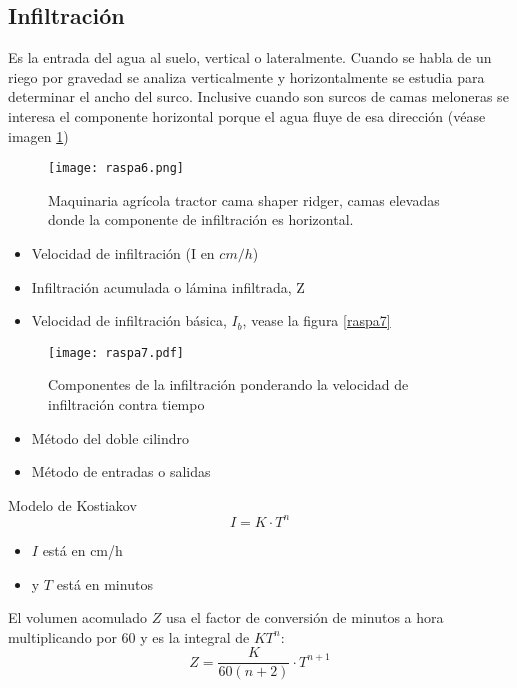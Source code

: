 \subsection{Infiltración}
Es la entrada del agua al suelo, vertical o lateralmente. Cuando se habla de un riego por gravedad
se analiza verticalmente y horizontalmente se estudia para determinar el ancho del surco.
Inclusive cuando son surcos de camas meloneras se interesa el componente horizontal porque el agua
fluye de esa dirección (véase imagen \ref{raspa6})
\begin{figure}[h!]
\centering
  \texttt{[image: raspa6.png]}
  \caption{Maquinaria agrícola tractor cama shaper ridger, camas elevadas donde la componente de infiltración es horizontal.}
  \label{raspa6}
\end{figure}
\begin{itemize}
    \item Velocidad de infiltración (I en $cm/h$)
    \item Infiltración acumulada o lámina infiltrada, Z
    \item Velocidad de infiltración básica, $I_b$, vease la figura \ref{raspa7}
\end{itemize}
\begin{figure}[h!]
\centering
  \texttt{[image: raspa7.pdf]}
  \caption{Componentes de la infiltración ponderando la velocidad de infiltración contra tiempo}
  \label{rapsa7}
\end{figure}
\begin{itemize}
    \item Método del doble cilindro
    \item Método de entradas o salidas
\end{itemize}
Modelo de Kostiakov
\begin{equation}
    I = K\cdot T^n
\end{equation}
\begin{notation}
    \begin{itemize}
        \item $I$ está en cm/h
        \item y $T$ está en minutos
    \end{itemize}
\end{notation}
El volumen acomulado $Z$ usa el factor de conversión de minutos a hora multiplicando por 60 y es la integral de $KT^n$:
\begin{equation}
    Z =\frac{K}{60(n + 2)}\cdot T^{n + 1}
\end{equation}
